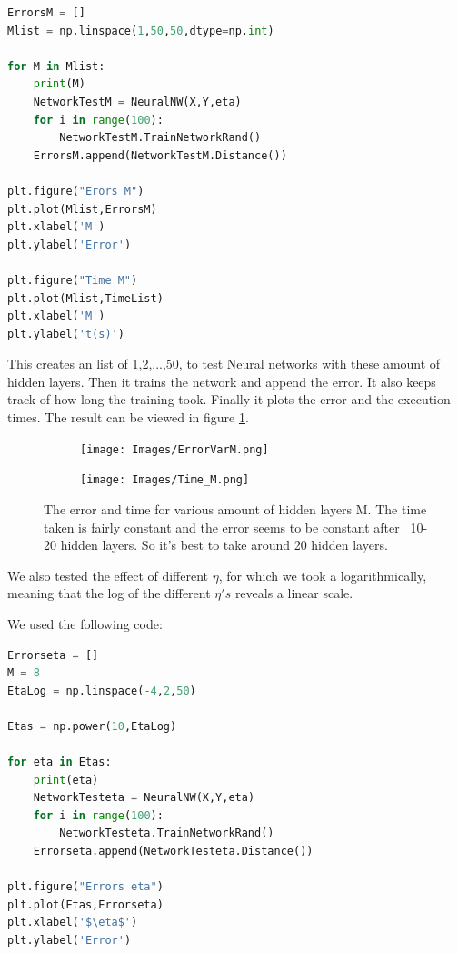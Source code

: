 \documentclass[a4paper]{article}
\begin{document}
\begin{lstlisting}[language=Python]
ErrorsM = []
Mlist = np.linspace(1,50,50,dtype=np.int)

for M in Mlist:
    print(M)
    NetworkTestM = NeuralNW(X,Y,eta)
    for i in range(100):
        NetworkTestM.TrainNetworkRand()
    ErrorsM.append(NetworkTestM.Distance())

plt.figure("Erors M")
plt.plot(Mlist,ErrorsM)
plt.xlabel('M')
plt.ylabel('Error')

plt.figure("Time M")
plt.plot(Mlist,TimeList)
plt.xlabel('M')
plt.ylabel('t(s)')
\end{lstlisting}

This creates an list of 1,2,...,50, to test Neural networks with these amount of hidden layers. Then it trains the network and append the error. It also keeps track of how long the training took. Finally it plots the error and the execution times.
The result can be viewed in figure \ref{Merror}.



\begin{figure}[H]	
	\begin{subfigure}{0.45\textwidth} %
		\texttt{[image: Images/ErrorVarM.png]}
	\end{subfigure}
	\begin{subfigure}{0.45\textwidth} %
		\texttt{[image: Images/Time\_M.png]}
	\end{subfigure}
	\caption{The error and time for various amount of hidden layers M. The time taken is fairly constant and the error seems to be constant after ~10-20 hidden layers. So it's best to take around 20 hidden layers.}
	\label{Merror}
\end{figure}


We also tested the effect of different $\eta$, for which we took a logarithmically, meaning that the log of the different $\eta's$ reveals a linear scale.

We used the following code:

\begin{lstlisting}[language=Python]
Errorseta = []
M = 8
EtaLog = np.linspace(-4,2,50)

Etas = np.power(10,EtaLog)

for eta in Etas:
    print(eta)
    NetworkTesteta = NeuralNW(X,Y,eta)
    for i in range(100):
        NetworkTesteta.TrainNetworkRand()
    Errorseta.append(NetworkTesteta.Distance())

plt.figure("Errors eta")
plt.plot(Etas,Errorseta)
plt.xlabel('$\eta$')
plt.ylabel('Error')
\end{lstlisting}
\end{document}
